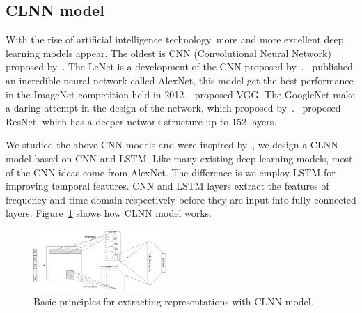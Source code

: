 \documentclass[conference]{IEEEtran}
\begin{document}
\subsection{CLNN model}
With the rise of artificial intelligence technology, more and more excellent deep learning models appear. The oldest is CNN (Convolutional Neural Network) proposed by~\cite{6}. The LeNet is a development of the CNN proposed by~\cite{7}.~\cite{8} published an incredible neural network called AlexNet, this model get the best performance in the ImageNet competition held in 2012.~\cite{9} proposed VGG. The GoogleNet make a daring attempt in the design of the network, which proposed by~\cite{10}.~\cite{11} proposed ResNet, which has a deeper network structure up to 152 layers.


We studied the above CNN models and were inspired by~\cite{clnn}, 
we design a CLNN model based on CNN and LSTM. Like many existing deep learning models, most of the CNN ideas come from AlexNet. The difference is we employ LSTM for improving temporal features. CNN and LSTM layers extract the features of frequency and time domain respectively before they are input into fully connected layers. Figure~\ref{fig:cnnlstm} shows how CLNN model works.

\begin{figure}[htp]
\begin{center}
\includegraphics[width=0.45\textwidth]{cnnlstm.eps}
\caption{Basic principles for extracting representations with CLNN model.}\label{fig:cnnlstm}
\end{center}
\end{figure}
\end{document}
